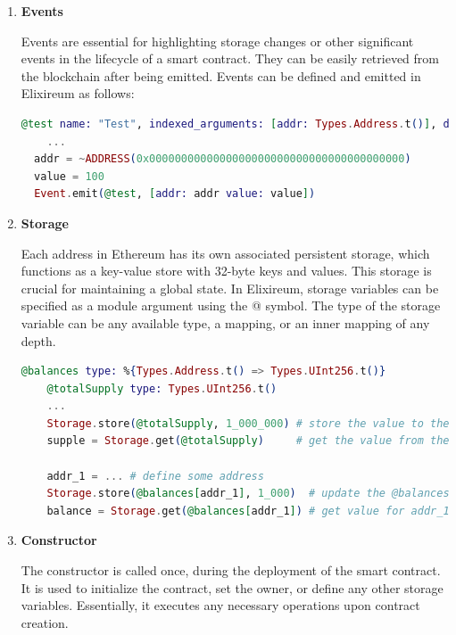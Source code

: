 \begin{enumerate}
  \item \textbf{Events}

  Events are essential for highlighting storage changes or other significant events in the lifecycle of a smart contract. They can be easily retrieved from the blockchain after being emitted. Events can be defined and emitted in Elixireum as follows:

  \begin{lstlisting}[caption={Events}, language=elixir, label={lst:calldata_decoding_recursive}]
  @test name: "Test", indexed_arguments: [addr: Types.Address.t()], data_arguments: [value: Types.UInt256.t()]
    ...
  addr = ~ADDRESS(0x0000000000000000000000000000000000000000)
  value = 100
  Event.emit(@test, [addr: addr value: value])
  \end{lstlisting}
  
  \item \textbf{Storage}
  
  Each address in Ethereum has its own associated persistent storage, which functions as a key-value store with 32-byte keys and values. This storage is crucial for maintaining a global state. In Elixireum, storage variables can be specified as a module argument using the @ symbol. The type of the storage variable can be any available type, a mapping, or an inner mapping of any depth.

  \begin{lstlisting}[caption={Storage}, language=elixir, label={lst:calldata_decoding_recursive}]
    @balances type: %{Types.Address.t() => Types.UInt256.t()}
    @totalSupply type: Types.UInt256.t()
    ...
    Storage.store(@totalSupply, 1_000_000) # store the value to the storage
    supple = Storage.get(@totalSupply)     # get the value from the storage
    
    addr_1 = ... # define some address
    Storage.store(@balances[addr_1], 1_000)  # update the @balances mapping for addr_1
    balance = Storage.get(@balances[addr_1]) # get value for addr_1 from @balances
  \end{lstlisting}
  
  \item \textbf{Constructor}

  The constructor is called once, during the deployment of the smart contract. It is used to initialize the contract, set the owner, or define any other storage variables. Essentially, it executes any necessary operations upon contract creation.
  

\end{enumerate}
